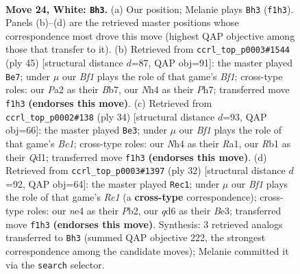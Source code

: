 \documentclass[11pt]{article}
\begin{document}
\clearpage

\begin{figure}[p]\centering
\begin{subfigure}{0.46\textwidth}\centering
\resizebox{\linewidth}{!}{%
\newchessgame
\chessboard[
  setfen={r1bn1k2/1ppp1ppp/p2q4/B2Pr3/Q3n2N/4P1P1/PP2RP1P/1R3BK1 w - - 23 24},
  showmover=false,
  pgfstyle=straightmove, color=movearrow, markmove={f1-h3}
]}
\caption{}
\end{subfigure}\hfill
\begin{subfigure}{0.46\textwidth}\centering
\resizebox{\linewidth}{!}{%
\newchessgame
\chessboard[
  setfen={r3rbk1/1bq2p1p/pp2p1p1/3pP3/P2N1PR1/2NnB2Q/1P4PP/5R1K b - - 1 23},
  showmover=false,
  pgfstyle=straightmove, color=movearrow, markmove={f8-e7}
]}
\caption{}
\end{subfigure}
\\[4pt]
\begin{subfigure}{0.46\textwidth}\centering
\resizebox{\linewidth}{!}{%
\newchessgame
\chessboard[
  setfen={rn2rbk1/pp3pp1/1q1p1n1p/3P4/1P2P3/P5P1/5NBP/R1BQR1K1 w - - 1 18},
  showmover=false,
  pgfstyle=straightmove, color=movearrow, markmove={c1-e3}
]}
\caption{}
\end{subfigure}\hfill
\begin{subfigure}{0.46\textwidth}\centering
\resizebox{\linewidth}{!}{%
\newchessgame
\chessboard[
  setfen={r1q3k1/1pp1bpp1/2n4p/p2rp3/Q7/P2PB1P1/1P1NPP1P/1R2R1K1 w - - 0 17},
  showmover=false,
  pgfstyle=straightmove, color=movearrow, markmove={e1-c1}
]}
\caption{}
\end{subfigure}
\caption{\textbf{Move 24, White: \texttt{Bh3}.} (a) Our position; Melanie plays \texttt{Bh3} (\texttt{f1h3}). Panels (b)--(d) are the retrieved master positions whose correspondence most drove this move (highest QAP objective among those that transfer to it). (b) Retrieved from \texttt{ccrl\_top\_p0003\#1544} (ply 45) [structural distance $d$=87, QAP obj=91]: the master played \texttt{Be7}; under $\mu$ our \emph{Bf1} plays the role of that game's \emph{Bf1}; cross-type roles: our \emph{P}a2 as their \emph{B}b7, our \emph{N}h4 as their \emph{P}h7; transferred move \texttt{f1h3} \textbf{(endorses this move)}. (c) Retrieved from \texttt{ccrl\_top\_p0002\#138} (ply 34) [structural distance $d$=93, QAP obj=66]: the master played \texttt{Be3}; under $\mu$ our \emph{Bf1} plays the role of that game's \emph{Bc1}; cross-type roles: our \emph{N}h4 as their \emph{R}a1, our \emph{R}b1 as their \emph{Q}d1; transferred move \texttt{f1h3} \textbf{(endorses this move)}. (d) Retrieved from \texttt{ccrl\_top\_p0003\#1397} (ply 32) [structural distance $d$=92, QAP obj=64]: the master played \texttt{Rec1}; under $\mu$ our \emph{Bf1} plays the role of that game's \emph{Re1} (a \textbf{cross-type} correspondence); cross-type roles: our \emph{n}e4 as their \emph{P}b2, our \emph{q}d6 as their \emph{B}e3; transferred move \texttt{f1h3} \textbf{(endorses this move)}. Synthesis: 3 retrieved analogs transferred to \texttt{Bh3} (summed QAP objective 222, the strongest correspondence among the candidate moves); Melanie committed it via the \texttt{search} selector.}
\label{fig:thought-m46}
\end{figure}
\end{document}
